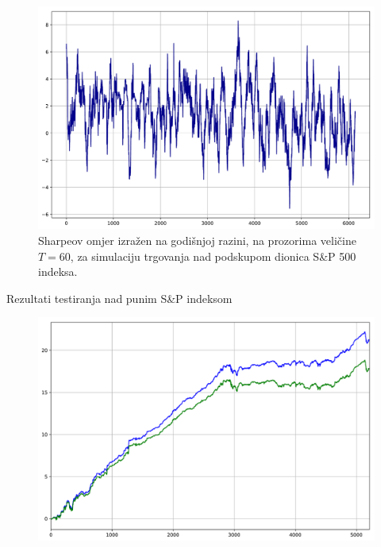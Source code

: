 \documentclass[lmodern, utf8, diplomski, numeric]{fer}
\begin{document}
  \begin{figure}[p]
    \centering
    \includegraphics[width=\linewidth]{graphics/sharpe1.pdf}
    \caption{Sharpeov omjer izražen na godišnjoj razini, na prozorima veličine $T = 60$, za simulaciju trgovanja nad podskupom dionica S\&P 500 indeksa.}
    \label{fig:sharpe1}
  \end{figure}

  
  \pagebreak

  Rezultati testiranja nad punim S\&P indeksom

  \begin{figure}[p]
    \centering
    \includegraphics[width=\linewidth]{graphics/results2.pdf}
    \caption{}
    \label{fig:results2}
  \end{figure}
\end{document}
